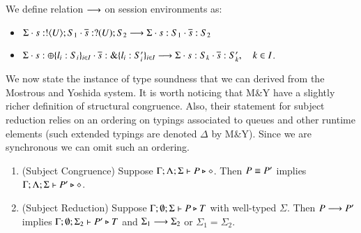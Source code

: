 \begin{definition}
	We define relation $\longrightarrow$ on session environments as:
	\begin{itemize}
		\item	$\Sigma \cdot s: ! \langle U \rangle ; S_1 \cdot \overline{s}: ? (U) ; S_2 \longrightarrow \Sigma \cdot s: S_1 \cdot \overline{s}: S_2$
		\item	$\Sigma \cdot s: \oplus \{l_i: S_i\}_{i \in I} \cdot \overline{s}: \& \{l_i: S_i'\}_{i \in I} \longrightarrow \Sigma \cdot s: S_k \cdot \overline{s}: S_k', \quad k \in I$.
	\end{itemize}
\end{definition}

We now state the instance of type soundness that we can derived from the Mostrous and Yoshida system.
It is worth noticing that M\&Y have a slightly richer definition of structural congruence.
Also, their statement for subject reduction relies on an ordering on typings associated to queues and other 
runtime elements (such extended typings are denoted $\Delta$ by M\&Y).
Since we are synchronous we can omit such an ordering.

\begin{theorem}
	\begin{enumerate}[1.]
		\item	(Subject Congruence) Suppose $\Gamma; \Lambda; \Sigma \vdash P \triangleright \diamond$.
			Then $P \equiv P'$ implies $\Gamma; \Lambda; \Sigma \vdash P' \triangleright \diamond$.

		\item	(Subject Reduction) Suppose $\Gamma; \emptyset; \Sigma \vdash P \triangleright T$
			with
			well-typed $\Sigma$.
			Then $P \longrightarrow P'$ implies $\Gamma; \emptyset; \Sigma_2  \vdash P' \triangleright T$
			and $\Sigma_1 \longrightarrow \Sigma_2$ or $\Sigma_1 = \Sigma_2$.
	\end{enumerate}
\end{theorem}

	

